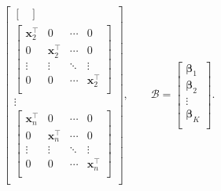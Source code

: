 \documentclass[11pt]{article}
\newcommand{\bx}{\bm{x}}
\newcommand{\bbeta}{\bm{\beta}}
\newcommand{\bBb}{\bm{\mathcal{B}}}
\begin{document}
\[\begin{bmatrix}
\begin{bmatrix}
\end{bmatrix} \\
\begin{bmatrix}
\bx_2^\top & 0 & \cdots & 0 \\
0 & \bx_2^\top & \cdots & 0 \\
\vdots & \vdots & \ddots & \vdots \\
0 & 0 & \cdots & \bx_2^\top \\
\end{bmatrix} \\
\vdots \\
\begin{bmatrix}
\bx_n^\top & 0 & \cdots & 0 \\
0 & \bx_n^\top & \cdots & 0 \\
\vdots & \vdots & \ddots & \vdots \\
0 & 0 & \cdots & \bx_n^\top \\
\end{bmatrix} \\
\end{bmatrix},\qquad
\bBb=\begin{bmatrix}
\bbeta_{1} \\
\bbeta_{2} \\
\vdots \\
\bbeta_{K} \\
\end{bmatrix}.\]
\end{document}
